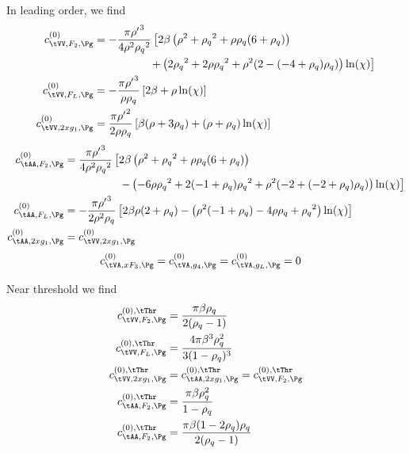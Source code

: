 In leading order, we find
\begin{align}
c^{(0)}_{\tVV,F_2,\Pg} &= -\frac{\pi {\rho'}^3 }{4 \rho ^2 {\rho_q}^2}\left[2\beta\left(\rho ^2+{\rho_q}^2+\rho  {\rho_q} (6+{\rho_q})\right) \right.\nonumber\\
 &\hspace{50pt}\left.+\left(2 {\rho_q}^2+2 \rho  {\rho_q}^2+\rho ^2 (2-(-4+{\rho_q}) {\rho_q})\right) \ln(\chi)\right]\\
c^{(0)}_{\tVV,F_L,\Pg} &= -\frac{\pi{\rho'}^3}{\rho\rho_q}\left[2\beta + \rho\ln(\chi)\right]\\
c^{(0)}_{\tVV,2xg_1,\Pg} &= \frac{\pi{\rho'}^2}{2\rho\rho_q}\left[\beta(\rho+3\rho_q) + (\rho+\rho_q)\ln(\chi)\right]
\end{align}
\begin{align}
c^{(0)}_{\tAA,F_2,\Pg} &= \frac{\pi {\rho'}^3}{4\rho^2{\rho_q}^2}\left[ 2\beta\left(\rho ^2+{\rho_q}^2+\rho  {\rho_q} (6+{\rho_q})\right) \right.\nonumber\\
 &\hspace{50pt} \left. - \left(-6 \rho  {\rho_q}^2+2 (-1+{\rho_q}) {\rho_q}^2+\rho ^2 (-2+(-2+{\rho_q}) {\rho_q})\right) \ln(\chi) \right] \\
c^{(0)}_{\tAA,F_L,\Pg} &=-\frac{\pi{\rho'}^3}{2\rho^2\rho_q}\left[2\beta\rho(2+\rho_q) - \left(\rho ^2 (-1+{\rho_q})-4 \rho  {\rho_q}+{\rho_q}^2\right) \ln(\chi)\right]\\
c^{(0)}_{\tAA,2xg_1,\Pg} &= c^{(0)}_{\tVV,2xg_1,\Pg}
\end{align}
\begin{align}
c^{(0)}_{\tVA,xF_3,\Pg} &= c^{(0)}_{\tVA,g_4,\Pg} = c^{(0)}_{\tVA,g_L,\Pg} = 0
\end{align}

Near threshold we find
\begin{align}
c^{(0),\tThr}_{\tVV,F_2,\Pg} &= \frac{\pi\beta\rho_q}{2(\rho_q-1)}\\
c^{(0),\tThr}_{\tVV,F_L,\Pg} &= \frac{4\pi\beta^3\rho_q^2}{3(1-\rho_q)^3}\\
c^{(0),\tThr}_{\tVV,2xg_1,\Pg} &= c^{(0),\tThr}_{\tAA,2xg_1,\Pg} = c^{(0),\tThr}_{\tVV,F_2,\Pg}\\
c^{(0),\tThr}_{\tAA,F_2,\Pg} &= \frac{\pi\beta\rho_q^2}{1-\rho_q}\\
c^{(0),\tThr}_{\tAA,F_2,\Pg} &= \frac{\pi\beta(1-2\rho_q)\rho_q}{2(\rho_q-1)}
\end{align}
